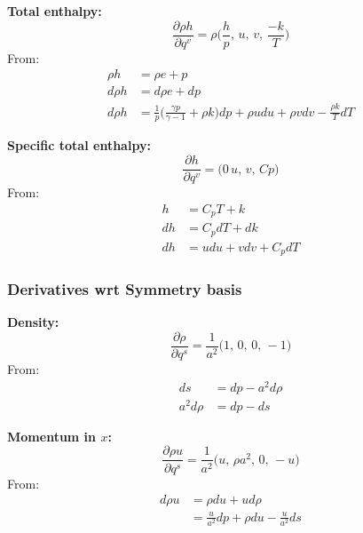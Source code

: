 \documentclass{article}
\begin{document}
\textbf{Total enthalpy:}
\begin{equation*}
    \frac{\partial \rho h}{\partial q^v} = \rho \big( \frac{h}{p},\, u,\, v,\, \frac{-k}{T} \big)
\end{equation*}
From:
\begin{equation*}
    \begin{split}
        \rho h  & = \rho e + p \\
        d\rho h & = d\rho e + dp \\
        d\rho h & = \frac{1}{p} \big(\frac{\gamma p}{\gamma-1} + \rho k \big)dp + \rho u du + \rho v dv - \frac{\rho k}{T}dT
    \end{split}
\end{equation*}

\textbf{Specific total enthalpy:}
\begin{equation*}
    \frac{\partial h}{\partial q^v} = \big( 0\, u,\, v,\, Cp \big)
\end{equation*}
From:
\begin{equation*}
    \begin{split}
        h  & = C_p T + k \\
        dh & = C_p dT + dk \\
        dh & = udu + vdv + C_p dT
    \end{split}
\end{equation*}


\subsubsection{Derivatives wrt Symmetry basis}

\textbf{Density:}
\begin{equation*}
    \frac{\partial \rho}{\partial q^s} = \frac{1}{a^2} \big( 1,\, 0,\, 0,\, -1 \big)
\end{equation*}
From:
\begin{equation*}
    \begin{split}
        ds & = dp - a^2 d\rho \\
        a^2 d\rho & = dp - ds
    \end{split}
\end{equation*}

\textbf{Momentum in $x$:}
\begin{equation*}
    \frac{\partial \rho u}{\partial q^s} = \frac{1}{a^2} \big( u,\, \rho a^2,\, 0,\, -u \big)
\end{equation*}
From:
\begin{equation*}
    \begin{split}
        d\rho u & = \rho du + ud\rho \\
                & = \frac{u}{a^2}dp + \rho du - \frac{u}{a^2}ds
    \end{split}
\end{equation*}
\end{document}
